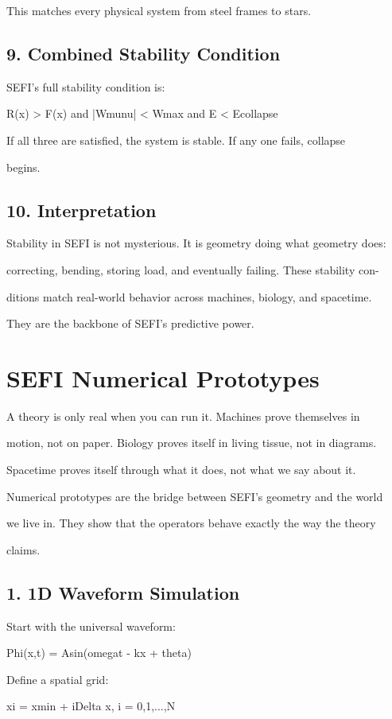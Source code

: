 \documentclass[10pt]{article}
\begin{document}
This matches every physical system from steel frames to stars.

\subsection*{9. Combined Stability Condition}
SEFI's full stability condition is:

R(x) > F(x) and |Wmunu| < Wmax and E < Ecollapse

If all three are satisfied, the system is stable. If any one fails, collapse

begins.

\subsection*{10. Interpretation}
Stability in SEFI is not mysterious. It is geometry doing what geometry does:

correcting, bending, storing load, and eventually failing. These stability con-

ditions match real-world behavior across machines, biology, and spacetime.

They are the backbone of SEFI's predictive power.

\section*{SEFI Numerical Prototypes}
A theory is only real when you can run it. Machines prove themselves in

motion, not on paper. Biology proves itself in living tissue, not in diagrams.

Spacetime proves itself through what it does, not what we say about it.

Numerical prototypes are the bridge between SEFI's geometry and the world

we live in. They show that the operators behave exactly the way the theory

claims.

\subsection*{1. 1D Waveform Simulation}
Start with the universal waveform:

Phi(x,t) = Asin(omegat - kx + theta)

Define a spatial grid:

xi = xmin + iDelta x, i = 0,1,...,N
\end{document}
